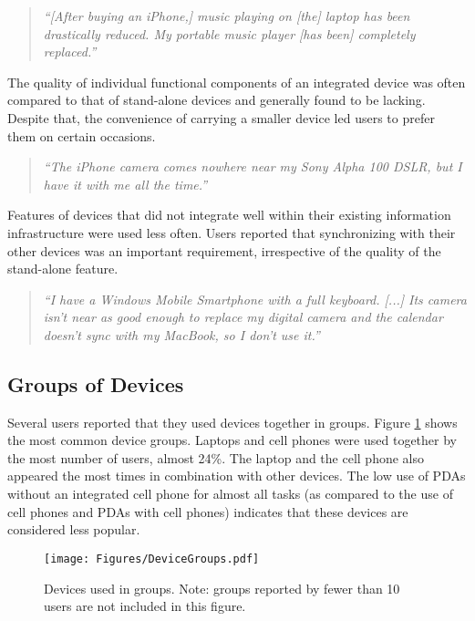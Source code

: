 \documentclass[twocolumn,final,10pt]{article}
\begin{document}
\begin{quotation}
\textit{``[After buying an iPhone,] music playing on [the] laptop has been drastically reduced. My portable music player [has been] completely replaced.''}
\end{quotation}

The quality of individual functional components of an integrated device was often compared to that of stand-alone devices and generally found to be lacking. Despite that, the convenience of carrying a smaller device led users to prefer them on certain occasions.

\begin{quotation}
\textit{``The iPhone camera comes nowhere near my Sony Alpha 100 DSLR, but I have it with me all the time.''}
\end{quotation}

Features of devices that did not integrate well within their existing information infrastructure were used less often. Users reported that synchronizing with their other devices was an important requirement, irrespective of the quality of the stand-alone feature.

\begin{quotation}
\textit{``I have a Windows Mobile Smartphone with a full keyboard. [...] Its camera isn't near as good enough to replace my digital camera and the calendar doesn't sync with my MacBook, so I don't use it.''}
\end{quotation}

\subsection{Groups of Devices}

Several users reported that they used devices together in groups. Figure \ref{figure:device-groups} shows the most common device groups. Laptops and cell phones were used together by the most number of users, almost 24\%. The laptop and the cell phone also appeared the most times in combination with other devices. The low use of PDAs without an integrated cell phone for almost all tasks (as compared to the use of cell phones and PDAs with cell phones) indicates that these devices are considered less popular.

\begin{figure}[htb]
\begin{center}
\texttt{[image: Figures/DeviceGroups.pdf]}
\caption{Devices used in groups. Note: groups reported by fewer than 10 users are not included in this figure.}
\label{figure:device-groups}
\end{center}
\end{figure}
\end{document}
